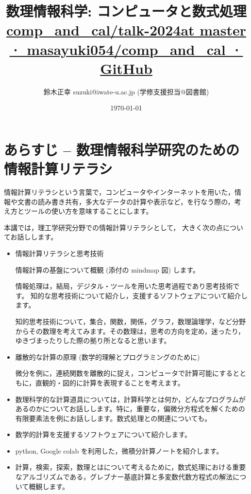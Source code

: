 \documentclass[dvipdfmx,11pat]{jarticle}
\author{鈴木正幸 suzuki@iwate-u.ac.jp (学修支援担当@図書館)}
\date{\today}
\title{ 数理情報科学: コンピュータと数式処理 \href{https://github.com/masayuki054/comp\_and\_cal/tree/master/talk-2024}{comp\_and\_cal/talk-2024at master · masayuki054/comp\_and\_cal · GitHub}}
\begin{document}
\maketitle
\tableofcontents

\section{あらすじ -- 数理情報科学研究のための情報計算リテラシ}
\label{sec:orgb6204f6}

情報計算リテラシという言葉で，コンピュータやインターネットを用いた，情
報や文書の読み書き共有，多大なデータの計算や表示など，を行なう際の，考
え方とツールの使い方を意味することにします。

本講では，理工学研究分野での情報計算リテラシとして，
大きく次の点についてお話しします。

\begin{itemize}
\item 情報計算リテラシと思考技術

情報計算の基盤について概観 (添付の mindmap 図) します。

情報処理は，結局，デジタル・ツールを用いた思考過程であり思考技術です。
知的な思考技術について紹介し，支援するソフトウェアについて紹介します。

知的思考技術について，集合，関数，関係，グラフ，数理論理学，など分野
からその数理を考えてみます。その数理は，思考の方向を定め，迷ったり，
ゆきづまったりした際の拠り所となると思います。

\item 離散的な計算の原理 (数学的理解とプログラミングのために)

微分を例に，連続関数を離散的に捉え，コンピュータで計算可能にするとと
もに，直観的・図的に計算を表現することを考えます。

\item 数理科学的な計算道具については，計算科学とは何か，どんなプログラムが
あるのかについてお話しします。特に，重要な，偏微分方程式を解くための
有限要素法を例にお話しします。数式処理との関連についても。

\item 数学的計算を支援するソフトウェアについて紹介します。

\item python, Google colab を利用した，微積分計算ノートを紹介します。

\item 計算，検索，探索，数理とはについて考えるために，数式処理における重要
なアルゴリズムである，グレブナー基底計算と多変数代数方程式の解法につ
いて概観します。
\end{itemize}
\end{document}
